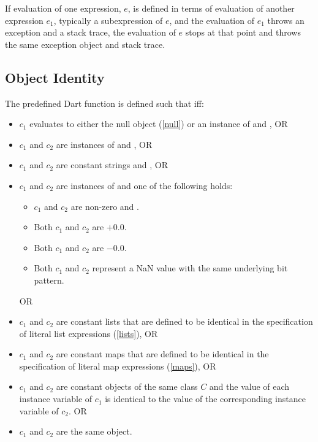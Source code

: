 \documentclass[makeidx]{article}
\begin{document}
{\LMHash{}%
If evaluation of one expression, $e$,
is defined in terms of evaluation of another expression $e_1$,
typically a subexpression of $e$,
and the evaluation of $e_1$ throws an exception and a stack trace,
the evaluation of $e$ stops at that point
and throws the same exception object and stack trace.


\subsection{Object Identity}

\LMHash{}%
The predefined Dart function 
is defined such that  if{}f:

\begin{itemize}
\item
  $c_1$ evaluates to either the null object (\ref{null})
  or an instance of  and , OR
\item
  $c_1$ and $c_2$ are instances of  and , OR
\item
  $c_1$ and $c_2$ are constant strings and , OR
\item
  $c_1$ and $c_2$ are instances of 
  and one of the following holds:
  \begin{itemize}
  \item $c_1$ and $c_2$ are non-zero and .
  \item Both $c_1$ and $c_2$ are $+0.0$.
  \item Both $c_1$ and $c_2$ are $-0.0$.
  \item Both $c_1$ and $c_2$ represent a NaN value
    with the same underlying bit pattern.
  \end{itemize}
 OR
\item
  $c_1$ and $c_2$ are constant lists that are defined to be identical
  in the specification of literal list expressions (\ref{lists}), OR
\item
  $c_1$ and $c_2$ are constant maps that are defined to be identical
  in the specification of literal map expressions (\ref{maps}), OR
\item
  $c_1$ and $c_2$ are constant objects of the same class $C$
  and the value of each instance variable of $c_1$ is identical to
  the value of the corresponding instance variable of $c_2$. OR
\item
  $c_1$ and $c_2$ are the same object.
\end{itemize}

}
\end{document}
